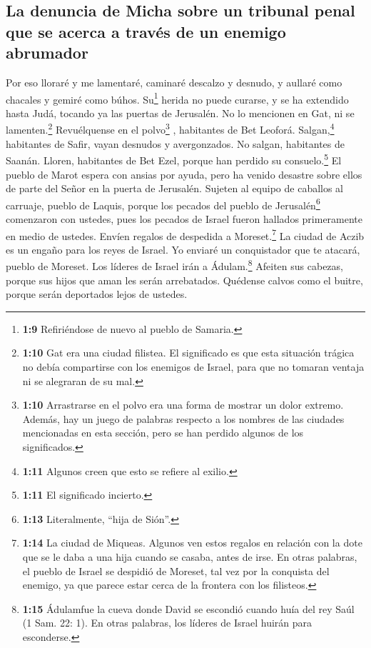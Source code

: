 \hypertarget{la-denuncia-de-micha-sobre-un-tribunal-penal-que-se-acerca-a-travuxe9s-de-un-enemigo-abrumador}{%
\subsection{La denuncia de Micha sobre un tribunal penal que se acerca a
través de un enemigo
abrumador}\label{la-denuncia-de-micha-sobre-un-tribunal-penal-que-se-acerca-a-travuxe9s-de-un-enemigo-abrumador}}

 Por eso lloraré y me lamentaré, caminaré descalzo y
desnudo, y aullaré como chacales y gemiré como búhos. 
Su\footnote{\textbf{1:9} Refiriéndose de nuevo al pueblo de Samaria.}
herida no puede curarse, y se ha extendido hasta Judá, tocando ya las
puertas de Jerusalén.  No lo mencionen en Gat, ni se
lamenten.\footnote{\textbf{1:10} Gat era una ciudad filistea. El
  significado es que esta situación trágica no debía compartirse con los
  enemigos de Israel, para que no tomaran ventaja ni se alegraran de su
  mal.} Revuélquense en el polvo\footnote{\textbf{1:10} Arrastrarse en
  el polvo era una forma de mostrar un dolor extremo. Además, hay un
  juego de palabras respecto a los nombres de las ciudades mencionadas
  en esta sección, pero se han perdido algunos de los significados.} ,
habitantes de Bet Leoforá.  Salgan,\footnote{\textbf{1:11}
  Algunos creen que esto se refiere al exilio.} habitantes de Safir,
vayan desnudos y avergonzados. No salgan, habitantes de Saanán. Lloren,
habitantes de Bet Ezel, porque han perdido su consuelo.\footnote{\textbf{1:11}
  El significado incierto.}  El pueblo de Marot espera
con ansias por ayuda, pero ha venido desastre sobre ellos de parte del
Señor en la puerta de Jerusalén.  Sujeten al equipo de
caballos al carruaje, pueblo de Laquis, porque los pecados del pueblo de
Jerusalén\footnote{\textbf{1:13} Literalmente, ``hija de Sión''.}
comenzaron con ustedes, pues los pecados de Israel fueron hallados
primeramente en medio de ustedes.  Envíen regalos de
despedida a Moreset.\footnote{\textbf{1:14} La ciudad de Miqueas.
  Algunos ven estos regalos en relación con la dote que se le daba a una
  hija cuando se casaba, antes de irse. En otras palabras, el pueblo de
  Israel se despidió de Moreset, tal vez por la conquista del enemigo,
  ya que parece estar cerca de la frontera con los filisteos.} La ciudad
de Aczib es un engaño para los reyes de Israel.  Yo
enviaré un conquistador que te atacará, pueblo de Moreset. Los líderes
de Israel irán a Ádulam.\footnote{\textbf{1:15} Ádulamfue la cueva donde
  David se escondió cuando huía del rey Saúl (1 Sam. 22: 1). En otras
  palabras, los líderes de Israel huirán para esconderse.}
 Afeiten sus cabezas, porque sus hijos que aman les serán
arrebatados. Quédense calvos como el buitre, porque serán deportados
lejos de ustedes.

